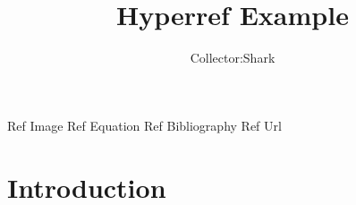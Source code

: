 \documentclass[12pt, a4paper, twocolumn]{article}
\begin{document}
\title{Hyperref Example}
\author{Collector:Shark}

\maketitle

Ref Image
Ref Equation
Ref Bibliography
Ref Url

\section{Introduction}
\label{intro}
\end{document}
